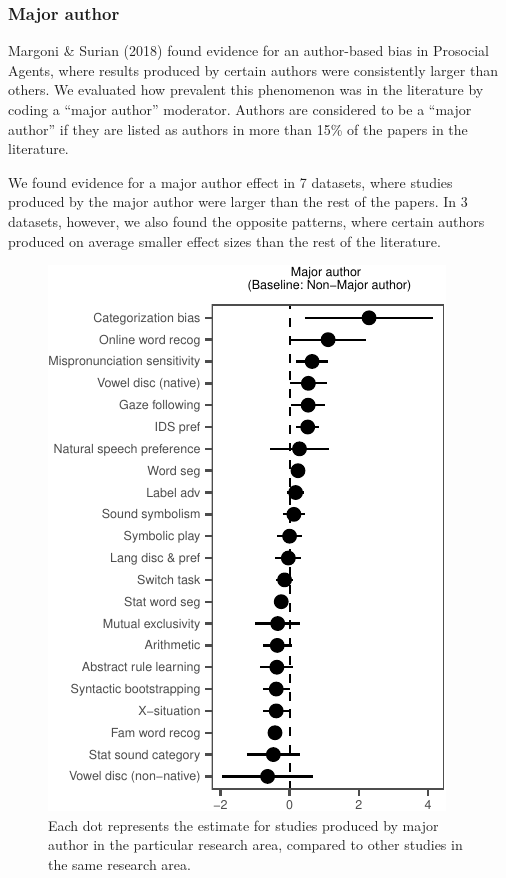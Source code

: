 \documentclass[10pt, letterpaper]{article}
\newenvironment{CodeChunk}{}{}
\begin{document}
\hypertarget{major-author}{%
\subsubsection{Major author}\label{major-author}}

Margoni \& Surian (2018) found evidence for an author-based bias in
Prosocial Agents, where results produced by certain authors were
consistently larger than others. We evaluated how prevalent this
phenomenon was in the literature by coding a ``major author'' moderator.
Authors are considered to be a ``major author'' if they are listed as
authors in more than 15\% of the papers in the literature.

We found evidence for a major author effect in 7 datasets, where studies
produced by the major author were larger than the rest of the papers. In
3 datasets, however, we also found the opposite patterns, where certain
authors produced on average smaller effect sizes than the rest of the
literature.

\begin{CodeChunk}
\begin{figure}[H]

{\centering \includegraphics{figs/image-1} 

}

\caption[Each dot represents the estimate for studies produced by major author in the particular research area, compared to other studies in the same research area]{Each dot represents the estimate for studies produced by major author in the particular research area, compared to other studies in the same research area.}\label{fig:image}
\end{figure}
\end{CodeChunk}
\end{document}
